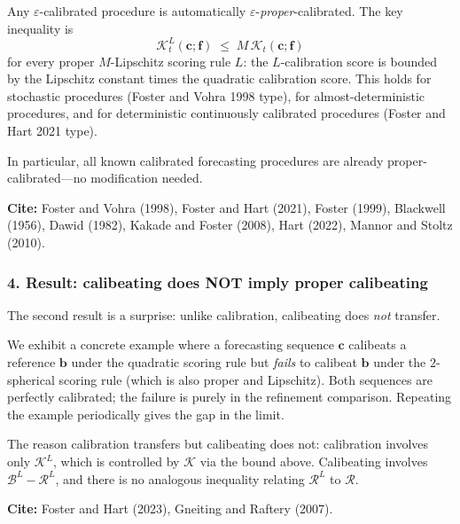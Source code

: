 Any $\varepsilon$-calibrated procedure is automatically
$\varepsilon$-\emph{proper}-calibrated.  The key inequality is
\[
\mathcal{K}^{L}_{t}(\mathbf{c};\mathbf{f})
\;\leq\; M\,\mathcal{K}_{t}(\mathbf{c};\mathbf{f})
\]
for every proper $M$-Lipschitz scoring rule $L$: the $L$-calibration
score is bounded by the Lipschitz constant times the quadratic
calibration score.  This holds for stochastic procedures (Foster and
Vohra 1998 type), for almost-deterministic procedures, and for
deterministic continuously calibrated procedures (Foster and Hart 2021
type).

In particular, all known calibrated forecasting procedures are already
proper-calibrated---no modification needed.

\medskip\noindent\textbf{Cite:}
Foster and Vohra (1998),
Foster and Hart (2021),
Foster (1999),
Blackwell (1956),  %
Dawid (1982),
Kakade and Foster (2008),
Hart (2022),
Mannor and Stoltz (2010).



\subsubsection*{4. Result: calibeating does NOT imply proper calibeating}

The second result is a surprise: unlike calibration, calibeating does
\emph{not} transfer.

We exhibit a concrete example where a forecasting sequence $\mathbf{c}$
calibeats a reference $\mathbf{b}$ under the quadratic scoring rule but
\emph{fails} to calibeat $\mathbf{b}$ under the $2$-spherical scoring
rule (which is also proper and Lipschitz).  Both sequences are perfectly
calibrated; the failure is purely in the refinement comparison.
Repeating the example periodically gives the gap in the limit.

The reason calibration transfers but calibeating does not: calibration
involves only $\mathcal{K}^{L}$, which is controlled by
$\mathcal{K}$ via the bound above.  Calibeating involves
$\mathcal{B}^{L} - \mathcal{R}^{L}$, and there is no analogous
inequality relating $\mathcal{R}^{L}$ to $\mathcal{R}$.

\medskip\noindent\textbf{Cite:}
Foster and Hart (2023),
Gneiting and Raftery (2007).  %


